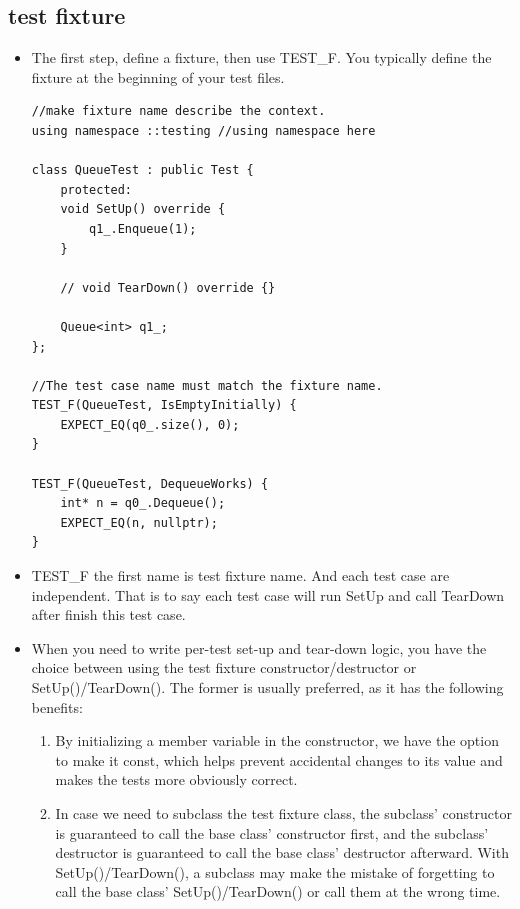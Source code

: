 \documentclass[a4paper,11pt,twoside]{book}
\begin{document}
\subsection{test fixture}
\begin{itemize}
	\item The first step, define a fixture, then use TEST\_F. You typically define the fixture at the beginning of your test files.
\begin{lstlisting}
//make fixture name describe the context.
using namespace ::testing //using namespace here

class QueueTest : public Test {
	protected:
	void SetUp() override {
		q1_.Enqueue(1);
	}
	
	// void TearDown() override {}
	
	Queue<int> q1_;
};

//The test case name must match the fixture name.
TEST_F(QueueTest, IsEmptyInitially) {
	EXPECT_EQ(q0_.size(), 0);
}

TEST_F(QueueTest, DequeueWorks) {
	int* n = q0_.Dequeue();
	EXPECT_EQ(n, nullptr);
}
\end{lstlisting}

\item TEST\_F the first name is test fixture name. And each test case are independent. That is to say each test case will run SetUp and call TearDown after finish this test case.

\item When you need to write per-test set-up and tear-down logic, you have the choice between using the test fixture constructor/destructor or SetUp()/TearDown(). The former is usually preferred, as it has the following benefits:
\begin{enumerate}
	\item By initializing a member variable in the constructor, we have the option to make it const, which helps prevent accidental changes to its value and makes the tests more obviously correct.
	
	\item In case we need to subclass the test fixture class, the subclass' constructor is guaranteed to call the base class' constructor first, and the subclass' destructor is guaranteed to call the base class' destructor afterward. With SetUp()/TearDown(), a subclass may make the mistake of forgetting to call the base class' SetUp()/TearDown() or call them at the wrong time.
\end{enumerate}

\end{itemize}
\end{document}
